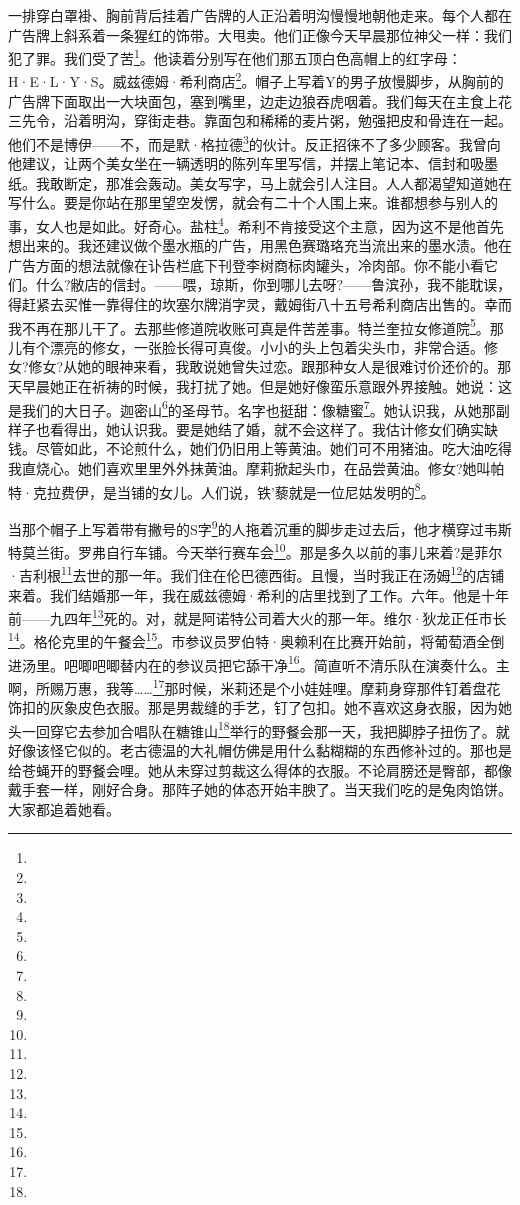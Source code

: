 \par 一排穿白罩褂、胸前背后挂着广告牌的人正沿着明沟慢慢地朝他走来。每个人都在广告牌上斜系着一条猩红的饰带。大甩卖。他们正像今天早晨那位神父一样：我们犯了罪。我们受了苦\footnote{}。他读着分别写在他们那五顶白色高帽上的红字母：H·E·L·Y·S。威兹德姆·希利商店\footnote{}。帽子上写着Y的男子放慢脚步，从胸前的广告牌下面取出一大块面包，塞到嘴里，边走边狼吞虎咽着。我们每天在主食上花三先令，沿着明沟，穿街走巷。靠面包和稀稀的麦片粥，勉强把皮和骨连在一起。他们不是博伊——不，而是默·格拉德\footnote{}的伙计。反正招徕不了多少顾客。我曾向他建议，让两个美女坐在一辆透明的陈列车里写信，并摆上笔记本、信封和吸墨纸。我敢断定，那准会轰动。美女写字，马上就会引人注目。人人都渴望知道她在写什么。要是你站在那里望空发愣，就会有二十个人围上来。谁都想参与别人的事，女人也是如此。好奇心。盐柱\footnote{}。希利不肯接受这个主意，因为这不是他首先想出来的。我还建议做个墨水瓶的广告，用黑色赛璐珞充当流出来的墨水渍。他在广告方面的想法就像在讣告栏底下刊登李树商标肉罐头，冷肉部。你不能小看它们。什么?敝店的信封。——喂，琼斯，你到哪儿去呀?——鲁滨孙，我不能耽误，得赶紧去买惟一靠得住的坎塞尔牌消字灵，戴姆街八十五号希利商店出售的。幸而我不再在那儿干了。去那些修道院收账可真是件苦差事。特兰奎拉女修道院\footnote{}。那儿有个漂亮的修女，一张脸长得可真俊。小小的头上包着尖头巾，非常合适。修女?修女?从她的眼神来看，我敢说她曾失过恋。跟那种女人是很难讨价还价的。那天早晨她正在祈祷的时候，我打扰了她。但是她好像蛮乐意跟外界接触。她说：这是我们的大日子。迦密山\footnote{}的圣母节。名字也挺甜：像糖蜜\footnote{}。她认识我，从她那副样子也看得出，她认识我。要是她结了婚，就不会这样了。我估计修女们确实缺钱。尽管如此，不论煎什么，她们仍旧用上等黄油。她们可不用猪油。吃大油吃得我直烧心。她们喜欢里里外外抹黄油。摩莉掀起头巾，在品尝黄油。修女?她叫帕特·克拉费伊，是当铺的女儿。人们说，铁'藜就是一位尼姑发明的\footnote{}。
\par 当那个帽子上写着带有撇号的S字\footnote{}的人拖着沉重的脚步走过去后，他才横穿过韦斯特莫兰街。罗弗自行车铺。今天举行赛车会\footnote{}。那是多久以前的事儿来着?是菲尔·吉利根\footnote{}去世的那一年。我们住在伦巴德西街。且慢，当时我正在汤姆\footnote{}的店铺来着。我们结婚那一年，我在威兹德姆·希利的店里找到了工作。六年。他是十年前——九四年\footnote{}死的。对，就是阿诺特公司着大火的那一年。维尔·狄龙正任市长\footnote{}。格伦克里的午餐会\footnote{}。市参议员罗伯特·奥赖利在比赛开始前，将葡萄酒全倒进汤里。吧唧吧唧替内在的参议员把它舔干净\footnote{}。简直听不清乐队在演奏什么。主啊，所赐万惠，我等……\footnote{}那时候，米莉还是个小娃娃哩。摩莉身穿那件钉着盘花饰扣的灰象皮色衣服。那是男裁缝的手艺，钉了包扣。她不喜欢这身衣服，因为她头一回穿它去参加合唱队在糖锥山\footnote{}举行的野餐会那一天，我把脚脖子扭伤了。就好像该怪它似的。老古德温的大礼帽仿佛是用什么黏糊糊的东西修补过的。那也是给苍蝇开的野餐会哩。她从未穿过剪裁这么得体的衣服。不论肩膀还是臀部，都像戴手套一样，刚好合身。那阵子她的体态开始丰腴了。当天我们吃的是兔肉馅饼。大家都追着她看。
